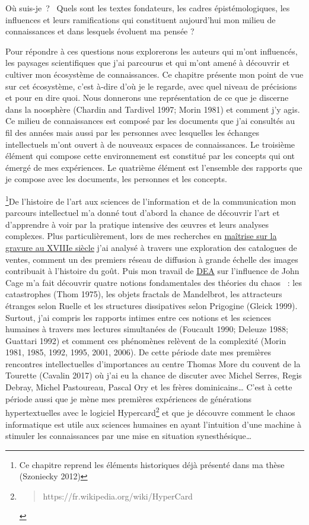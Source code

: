 \documentclass[
  letterpaper,
  DIV=11,
  numbers=noendperiod]{scrreprt}
\begin{document}
Où suis-je~? ~Quels sont les textes fondateurs, les cadres
épistémologiques, les influences et leurs ramifications qui constituent
aujourd'hui mon milieu de connaissances et dans lesquels évoluent ma
pensée ?

Pour répondre à ces questions nous explorerons les auteurs qui m'ont
influencés, les paysages scientifiques que j'ai parcourus et qui m'ont
amené à découvrir et cultiver mon écosystème de connaissances. Ce
chapitre présente mon point de vue sur cet écosystème, c'est à-dire d'où
je le regarde, avec quel niveau de précisions et pour en dire quoi. Nous
donnerons une représentation de ce que je discerne dans la noosphère
(Chardin and Tardivel 1997; Morin 1981) et comment j'y agis. Ce milieu
de connaissances est composé par les documents que j'ai consultés au fil
des années mais aussi par les personnes avec lesquelles les échanges
intellectuels m'ont ouvert à de nouveaux espaces de connaissances. Le
troisième élément qui compose cette environnement est constitué par les
concepts qui ont émergé de mes expériences. Le quatrième élément est
l'ensemble des rapports que je compose avec les documents, les personnes
et les concepts.

\footnote{Ce chapitre reprend les éléments historiques déjà présenté
  dans ma thèse (Szoniecky 2012)}De l'histoire de l'art aux sciences de
l'information et de la communication mon parcours intellectuel m'a donné
tout d'abord la chance de découvrir l'art et d'apprendre à voir par la
pratique intensive des œuvres et leurs analyses complexes. Plus
particulièrement, lors de mes recherches en
\href{http://localhost/samszo/omk/s/fiches/item/299343}{maîtrise sur la
gravure au XVIIIe siècle} j'ai analysé à travers une exploration des
catalogues de ventes, comment un des premiers réseau de diffusion à
grande échelle des images contribuait à l'histoire du goût. Puis mon
travail de \href{http://localhost/samszo/omk/s/fiches/item/299342}{DEA}
sur l'influence de John Cage m'a fait découvrir quatre notions
fondamentales des théories du chaos ~: les catastrophes (Thom 1975), les
objets fractals de Mandelbrot, les attracteurs étranges selon Ruelle et
les structures dissipatives selon Prigogine (Gleick 1999). Surtout, j'ai
compris les rapports intimes entre ces notions et les sciences humaines
à travers mes lectures simultanées de (Foucault 1990; Deleuze 1988;
Guattari 1992) et comment ces phénomènes relèvent de la complexité
(Morin 1981, 1985, 1992, 1995, 2001, 2006). De cette période date mes
premières rencontres intellectuelles d'importances au centre Thomas More
du couvent de la Tourette (Cavalin 2017) où j'ai eu la chance de
discuter avec Michel Serres, Regis Debray, Michel Pastoureau, Pascal Ory
et les frères dominicains\ldots{} C'est à cette période aussi que je
mène mes premières expériences de générations hypertextuelles avec le
logiciel Hypercard\footnote{\begin{quote}
  https://fr.wikipedia.org/wiki/HyperCard
  \end{quote}} et que je découvre comment le chaos informatique est
utile aux sciences humaines en ayant l'intuition d'une machine à
stimuler les connaissances par une mise en situation
synesthésique\ldots{}
\end{document}
